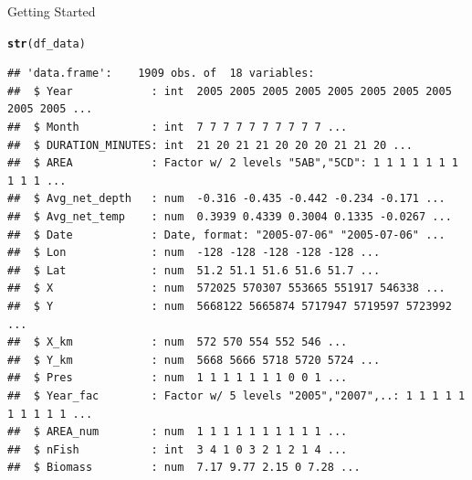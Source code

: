 \documentclass{beamer}\usepackage[]{graphicx}\usepackage[]{color}
\makeatletter
\newcommand{\hlstd}[1]{\textcolor[rgb]{0.345,0.345,0.345}{#1}}%
\newcommand{\hlkwd}[1]{\textcolor[rgb]{0.737,0.353,0.396}{\textbf{#1}}}%
\newenvironment{kframe}{%
 \def\at@end@of@kframe{}%
 \ifinner\ifhmode%
  \def\at@end@of@kframe{\end{minipage}}%
  \begin{minipage}{\columnwidth}%
 \fi\fi%
 \def\FrameCommand##1{\hskip\@totalleftmargin \hskip-\fboxsep
 \colorbox{shadecolor}{##1}\hskip-\fboxsep
     \hskip-\linewidth \hskip-\@totalleftmargin \hskip\columnwidth}%
 \MakeFramed {\advance\hsize-\width
   \@totalleftmargin\z@ \linewidth\hsize
   \@setminipage}}%
 {\par\unskip\endMakeFramed%
 \at@end@of@kframe}
\newenvironment{knitrout}{}{} %
\makeatother
\begin{document}
\begin{frame}[fragile]{Getting Started}
\begin{knitrout}\scriptsize
{}\color{fgcolor}\begin{kframe}
\begin{alltt}
  \hlkwd{str}\hlstd{(df_data)}
\end{alltt}
\begin{verbatim}
## 'data.frame':	1909 obs. of  18 variables:
##  $ Year            : int  2005 2005 2005 2005 2005 2005 2005 2005 2005 2005 ...
##  $ Month           : int  7 7 7 7 7 7 7 7 7 7 ...
##  $ DURATION_MINUTES: int  21 20 21 21 20 20 20 21 21 20 ...
##  $ AREA            : Factor w/ 2 levels "5AB","5CD": 1 1 1 1 1 1 1 1 1 1 ...
##  $ Avg_net_depth   : num  -0.316 -0.435 -0.442 -0.234 -0.171 ...
##  $ Avg_net_temp    : num  0.3939 0.4339 0.3004 0.1335 -0.0267 ...
##  $ Date            : Date, format: "2005-07-06" "2005-07-06" ...
##  $ Lon             : num  -128 -128 -128 -128 -128 ...
##  $ Lat             : num  51.2 51.1 51.6 51.6 51.7 ...
##  $ X               : num  572025 570307 553665 551917 546338 ...
##  $ Y               : num  5668122 5665874 5717947 5719597 5723992 ...
##  $ X_km            : num  572 570 554 552 546 ...
##  $ Y_km            : num  5668 5666 5718 5720 5724 ...
##  $ Pres            : num  1 1 1 1 1 1 1 0 0 1 ...
##  $ Year_fac        : Factor w/ 5 levels "2005","2007",..: 1 1 1 1 1 1 1 1 1 1 ...
##  $ AREA_num        : num  1 1 1 1 1 1 1 1 1 1 ...
##  $ nFish           : int  3 4 1 0 3 2 1 2 1 4 ...
##  $ Biomass         : num  7.17 9.77 2.15 0 7.28 ...
\end{verbatim}
\end{kframe}
\end{knitrout}
\end{frame}

\end{document}
